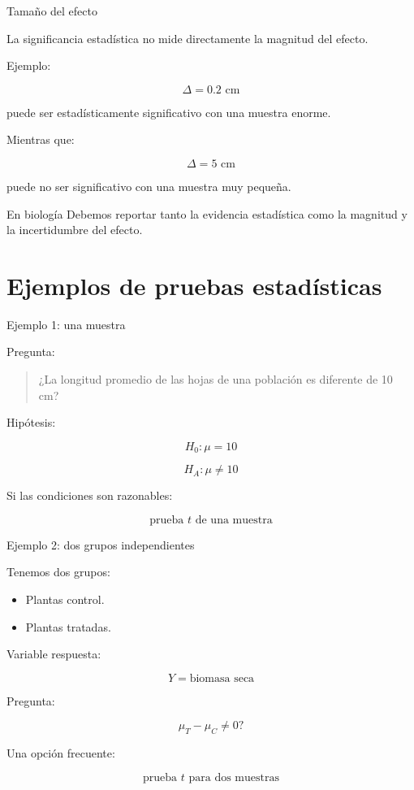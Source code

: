 \documentclass[11pt, aspectratio=169]{beamer}
\begin{document}
\begin{frame}{Tamaño del efecto}

La significancia estadística no mide directamente la magnitud del efecto.

Ejemplo:

\[
\Delta = 0.2\text{ cm}
\]

puede ser estadísticamente significativo con una muestra enorme.

Mientras que:

\[
\Delta = 5\text{ cm}
\]

puede no ser significativo con una muestra muy pequeña.

\begin{block}{En biología}
Debemos reportar tanto la evidencia estadística como la magnitud
y la incertidumbre del efecto.
\end{block}

\end{frame}

\section{Ejemplos de pruebas estadísticas}

\begin{frame}{Ejemplo 1: una muestra}

Pregunta:

\begin{quote}
¿La longitud promedio de las hojas de una población es diferente
de 10 cm?
\end{quote}

Hipótesis:

\[
H_0:\mu=10
\]

\[
H_A:\mu\neq10
\]

Si las condiciones son razonables:

\[
\text{prueba }t\text{ de una muestra}
\]

\end{frame}

\begin{frame}{Ejemplo 2: dos grupos independientes}

Tenemos dos grupos:

\begin{itemize}
    \item Plantas control.
    \item Plantas tratadas.
\end{itemize}

Variable respuesta:

\[
Y=\text{biomasa seca}
\]

Pregunta:

\[
\mu_T-\mu_C\neq0?
\]

Una opción frecuente:

\[
\boxed{\text{prueba }t\text{ para dos muestras}}
\]

\end{frame}
\end{document}
